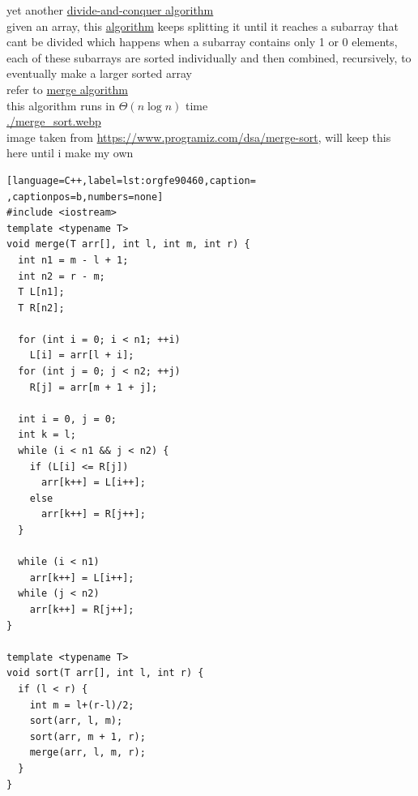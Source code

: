 \documentclass[a4paper,12pt]{article}
\newcommand{\?}{\stackrel{?}{=}}
\begin{document}
\newenvironment{note}
  {\begin{bclogo}[logo=\bcinfo, couleurBarre=orange, couleur=lightgray]{ note}}
  {\end{bclogo}}
\newenvironment{attention}
  {\begin{bclogo}[logo=\bcattention, couleurBarre=red, noborder=true, 
                couleur=red!15]{Important!}}
  {\end{bclogo}}

yet another \href{20220706211939-divide_and_conquer_algorithm.org}{divide-and-conquer algorithm}\\[0pt]
given an array, this \href{20220706211958-algorithm.org}{algorithm} keeps splitting it until it reaches a subarray that cant be divided which happens when a subarray contains only 1 or 0 elements, each of these subarrays are sorted individually and then combined, recursively, to eventually make a larger sorted array\\[0pt]
refer to \href{20230204143746-merge_algorithm.org}{merge algorithm}\\[0pt]
this algorithm runs in \(\Theta(n\log n)\) time\\[0pt]
\url{./merge\_sort.webp}\\[0pt]
image taken from \url{https://www.programiz.com/dsa/merge-sort}, will keep this here until i make my own\\[0pt]
\begin{lstlisting}[language=C++,label=lst:orgfe90460,caption= ,captionpos=b,numbers=none]
#include <iostream>
template <typename T>
void merge(T arr[], int l, int m, int r) {
  int n1 = m - l + 1;
  int n2 = r - m;
  T L[n1];
  T R[n2];

  for (int i = 0; i < n1; ++i)
    L[i] = arr[l + i];
  for (int j = 0; j < n2; ++j)
    R[j] = arr[m + 1 + j];

  int i = 0, j = 0;
  int k = l;
  while (i < n1 && j < n2) {
    if (L[i] <= R[j])
      arr[k++] = L[i++];
    else
      arr[k++] = R[j++];
  }

  while (i < n1)
    arr[k++] = L[i++];
  while (j < n2)
    arr[k++] = R[j++];
}

template <typename T>
void sort(T arr[], int l, int r) {
  if (l < r) {
    int m = l+(r-l)/2;
    sort(arr, l, m);
    sort(arr, m + 1, r);
    merge(arr, l, m, r);
  }
}
\end{lstlisting}
\end{document}

